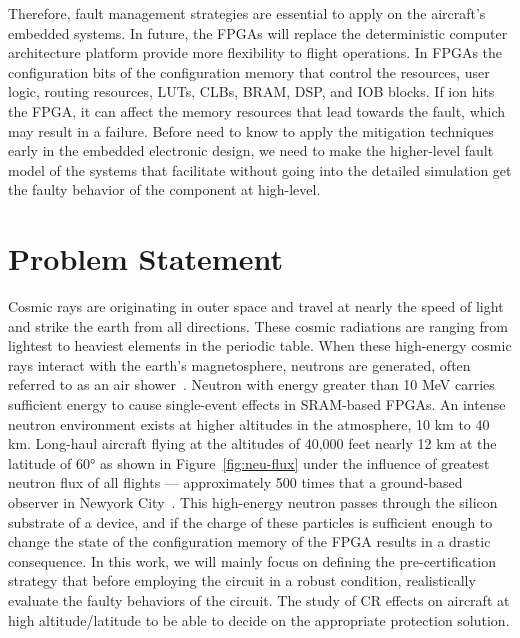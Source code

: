 Therefore, fault management strategies are essential to apply on the aircraft's embedded systems. In future, the FPGAs will replace the deterministic computer architecture platform provide more flexibility to flight operations. In FPGAs the configuration bits of the configuration memory that control the resources, user logic, routing resources, LUTs, CLBs, BRAM, DSP, and IOB blocks. If ion hits the FPGA, it can affect the memory resources that lead towards the fault, which may result in a failure. Before need to know to apply the mitigation techniques early in the embedded electronic design, we need to make the higher-level fault model of the systems that facilitate without going into the detailed simulation get the faulty behavior of the component at high-level.

  

\section{Problem Statement}

Cosmic rays are originating in outer space and travel at nearly the speed of light and strike the earth from all directions. These cosmic radiations are ranging from lightest to heaviest elements in the periodic table. When these high-energy cosmic rays interact with the earth's magnetosphere, neutrons are generated, often referred to as an air shower~\cite{lesea2005rosetta}. Neutron with energy greater than 10 MeV carries sufficient energy to cause single-event effects in SRAM-based FPGAs. An intense neutron environment exists at higher altitudes in the atmosphere, 10 km to 40 km.  Long-haul aircraft flying at the altitudes of 40,000 feet nearly 12 km at the latitude of \ang{60} as shown in Figure~\ref{fig:neu-flux}  under the influence of greatest neutron flux of all flights --- approximately 500 times that a ground-based observer in Newyork City~\cite{lesea2005rosetta}. This high-energy neutron passes through the silicon substrate of a device, and if the charge of these particles is sufficient enough to change the state of the configuration memory of the FPGA results in a drastic consequence. In this work, we will mainly focus on defining the pre-certification strategy that before employing the circuit in a robust condition, realistically evaluate the faulty behaviors of the circuit. The study of CR effects on aircraft at high altitude/latitude to be able to decide on the appropriate protection solution.


